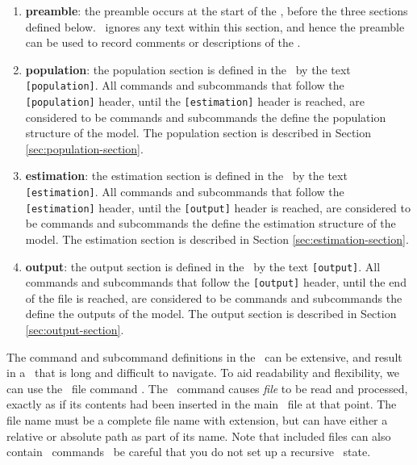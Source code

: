 \begin{enumerate}
\item \textbf{preamble}: 
the preamble occurs at the start of the \config, before the three sections defined below. \SPM\ ignores any text within this section, and hence the preamble can be used to record comments or descriptions of the \config. 

\item \textbf{population}: 
the population section is defined in the \config\ by the text \texttt{[population]}. All commands and subcommands that follow the \texttt{[population]} header, until the \texttt{[estimation]} header is reached, are considered to be commands and subcommands the define the population structure of the model. The population section is described in Section \ref{sec:population-section}.

\item \textbf{estimation}:
the estimation section is defined in the \config\ by the text \texttt{[estimation]}. All commands and subcommands that follow the \texttt{[estimation]} header, until the \texttt{[output]} header is reached, are considered to be commands and subcommands the define the estimation structure of the model.  The estimation section is described in Section \ref{sec:estimation-section}.

\item \textbf{output}:
the output section is defined in the \config\ by the text \texttt{[output]}. All commands and subcommands that follow the \texttt{[output]} header, until the end of the file is reached, are considered to be commands and subcommands the define the outputs of the model.  The output section is described in Section \ref{sec:output-section}.

\end{enumerate}

The command and subcommand definitions in the \config\ can be extensive, and result in a \config\ that is long and difficult to navigate. To aid readability and flexibility, we can use the \config\ file command . The \ command causes \emph{file} to be read and processed, exactly as if its contents had been inserted in the main \config\ file at that point. The file name must be a complete file name with extension, but can have either a relative or absolute path as part of its name. Note that included files can also contain \ commands \textemdash\ be careful that you do not set up a recursive \ state.

